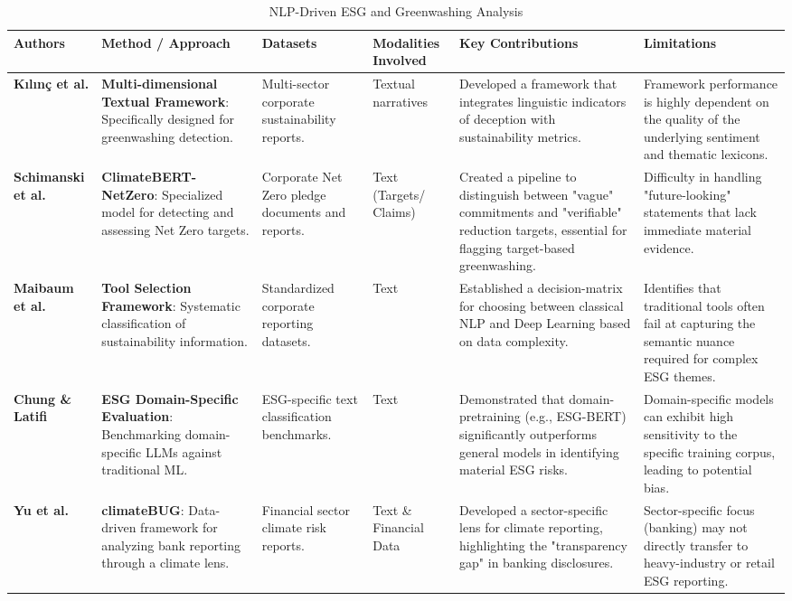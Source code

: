 \documentclass[english, online, cse, master]{dithesis}
\begin{document}
\begin{landscape}
\begin{table}[p]
\centering
\caption{NLP-Driven ESG and Greenwashing Analysis}
\label{tab:nlp-driven-esg-greenwashing}
\small
\renewcommand{\arraystretch}{1.2}
\begin{tabularx}{\linewidth}{|p{1.8cm}|X|X|p{1.8cm}|X|X|}
\hline
Authors & Method / Approach & Datasets & Modalities Involved & Key Contributions & Limitations \\ \hline
\textbf{Kılınç et al.}  \parencite{yavuz_k_l_n__64e32f80} & \textbf{Multi-dimensional Textual Framework}: Specifically designed for greenwashing detection. & Multi-sector corporate sustainability reports. & Textual narratives & Developed a framework that integrates linguistic indicators of deception with sustainability metrics. & Framework performance is highly dependent on the quality of the underlying sentiment and thematic lexicons. \\ \hline
\textbf{Schimanski et al.}  \parencite{tobias_schimanski_241ada20} & \textbf{ClimateBERT-NetZero}: Specialized model for detecting and assessing Net Zero targets. & Corporate Net Zero pledge documents and reports. & Text (Targets/ Claims) & Created a pipeline to distinguish between "vague" commitments and "verifiable" reduction targets, essential for flagging target-based greenwashing. & Difficulty in handling "future-looking" statements that lack immediate material evidence. \\ \hline
\textbf{Maibaum et al.}  \parencite{frederik_maibaum_b8629037} & \textbf{Tool Selection Framework}: Systematic classification of sustainability information. & Standardized corporate reporting datasets. & Text & Established a decision-matrix for choosing between classical NLP and Deep Learning based on data complexity. & Identifies that traditional tools often fail at capturing the semantic nuance required for complex ESG themes. \\ \hline
\textbf{Chung \& Latifi}  \parencite{tae_sun_chung_e16a4c18} & \textbf{ESG Domain-Specific Evaluation}: Benchmarking domain-specific LLMs against traditional ML. & ESG-specific text classification benchmarks. & Text & Demonstrated that domain-pretraining (e.g., ESG-BERT) significantly outperforms general models in identifying material ESG risks. & Domain-specific models can exhibit high sensitivity to the specific training corpus, leading to potential bias. \\ \hline
\textbf{Yu et al.}  \parencite{yinan_yu_e282fd98} & \textbf{climateBUG}: Data-driven framework for analyzing bank reporting through a climate lens. & Financial sector climate risk reports. & Text \& Financial Data & Developed a sector-specific lens for climate reporting, highlighting the "transparency gap" in banking disclosures. & Sector-specific focus (banking) may not directly transfer to heavy-industry or retail ESG reporting. \\ \hline

\end{tabularx}
\end{table}
\end{landscape}
\end{document}
